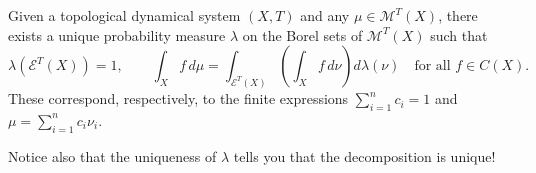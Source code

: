 \documentclass[11pt,a4paper]{article}
\begin{document}
\setcounter{theorem}{21}\begin{theorem}
Given a topological dynamical system $(X,T)$ and any $\mu\in\mathcal M^T(X)$, there exists a unique probability measure $\lambda$ on the Borel sets of $\mathcal M^T(X)$ such that
\[
 \lambda(\mathcal E^T(X))=1,
 \qquad
 \int_Xf\,d\mu=\int_{\mathcal E^T(X)}\left(\int_Xf\,d\nu\right)d\lambda(\nu)
 \quad\text{for all }f\in C(X).
\]
These correspond, respectively, to the finite expressions $\sum_{i=1}^n c_i=1$ and $\mu=\sum_{i=1}^n c_i\nu_i$.
\end{theorem}

\begin{remark}
Notice also that the uniqueness of $\lambda$ tells you that the decomposition
is unique!
\end{remark}
\end{document}
